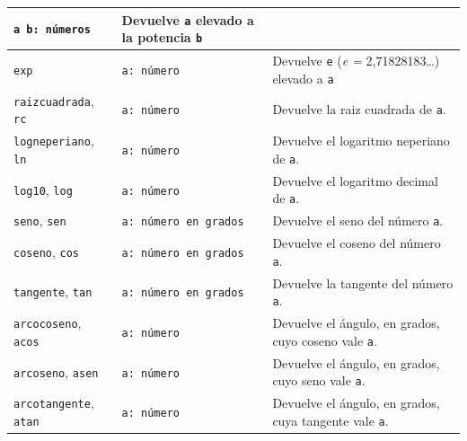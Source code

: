 \begin{center}
\begin{longtable}{|m{3cm}|m{2.6cm}|m{9cm}|}
      \texttt{a b: n\'umeros} &
        Devuelve \texttt{a} elevado a la potencia \texttt{b}\\ \hline 
   \texttt{exp} \index{exp@\texttt{exp}} & 
      \texttt{a: n\'umero} &
        Devuelve \texttt{e} (\textit{e = } 2,71828183\ldots) elevado a
        \texttt{a}\\ \hline 
   \texttt{raizcuadrada}, \index{raizcuadrada@\texttt{raizcuadrada}}
     \texttt{rc} \index{rc@\texttt{rc}} & \texttt{a: n\'umero} &
        Devuelve la raiz cuadrada de \texttt{a}. \\ \hline 
   \texttt{logneperiano}, \index{logneperiano@\texttt{logneperiano}}
      \texttt{ln} \index{ln@\texttt{ln}} & \texttt{a: n\'umero} &
        Devuelve el logaritmo neperiano de \texttt{a}.\index{Logaritmos}\\ \hline
   \texttt{log10}, \index{log10@\texttt{log10}}
      \texttt{log} \index{log@\texttt{log}} & \texttt{a: n\'umero} &
        Devuelve el logaritmo decimal de \texttt{a}.\index{Logaritmos}\\ \hline
   \texttt{seno}, \index{seno@\texttt{seno}}  
   \texttt{sen} \index{sen@\texttt{sen}} & \texttt{a: n\'umero en grados} &
        Devuelve el seno \index{Seno} del n\'umero \texttt{a}. 
        \index{Funciones trigonom\'etricas} \\ \hline 
   \texttt{coseno}, \index{coseno@\texttt{coseno}}  
   \texttt{cos} \index{cos@\texttt{cos}} & \texttt{a: n\'umero en grados} &
        Devuelve el coseno \index{Coseno} del n\'umero \texttt{a}. \\ \hline 
   \texttt{tangente}, \index{tangente@\texttt{tangente}} 
     \texttt{tan} \index{tan@\texttt{tan}} & \texttt{a: n\'umero en grados} &
       Devuelve la tangente \index{Tangente} del n\'umero \texttt{a}. \\ \hline 
   \texttt{arcocoseno}, \index{arcocoseno@\texttt{arcocoseno}} 
     \texttt{acos} \index{acos@\texttt{acos}} & \texttt{a: n\'umero} &
       Devuelve el \'angulo, en grados, cuyo coseno vale \texttt{a}. \\ \hline 
   \texttt{arcoseno}, \index{arcoseno@\texttt{arcoseno}}
     \texttt{asen} \index{asen@\texttt{asen}} & \texttt{a: n\'umero} &
        Devuelve el \'angulo, en grados, cuyo seno vale \texttt{a}. \\ \hline 
   \texttt{arcotangente}, \index{arcotangente@\texttt{arcotangente}}
     \texttt{atan} \index{atan@\texttt{atan}} & \texttt{a: n\'umero} &
      Devuelve el \'angulo, en grados, cuya tangente vale \texttt{a}. \\ \hline 

\end{longtable}
\end{center}
